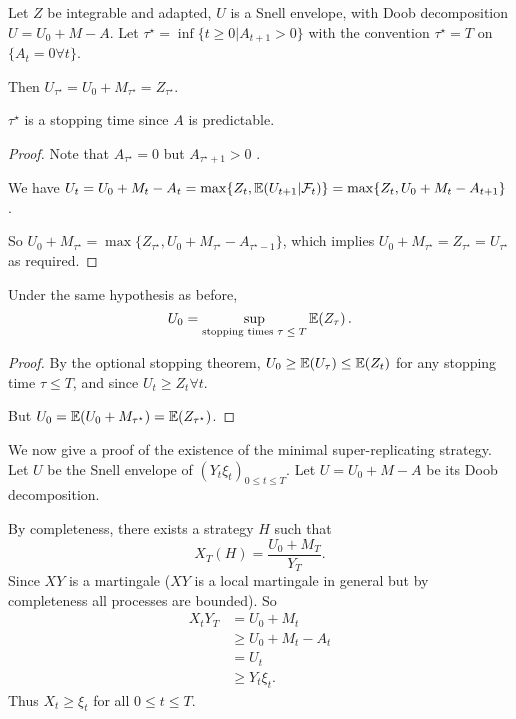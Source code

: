 \begin{thm}
  \label{defn:discrete_time_models:32}
  Let $Z$ be integrable and adapted, $U$ is a Snell envelope, with
  Doob decomposition $U = U_{0} + M - A$.  Let $\tau^{\star} = \inf \{
  t \geq 0 | A_{t + 1} > 0 \}$ with the convention $\tau^{\star} = T$
  on $\{ A_{t} = 0 \forall t \}$.

  Then $U_{\tau^{\star}} = U_{0} + M_{\tau^{\star}} = Z_{\tau^{\star}}$.
\end{thm}

\begin{remark}
  $\tau^{\star}$ is a stopping time since $A$ is predictable.
\end{remark}

\begin{proof}
  Note that $A_{\tau^{\star}} = 0$ but $A_{\tau^{\star} + 1} > 0$ .

  We have $U_{t} = U_{0} + M_{t} - A_{t} = \max \{ Z_{t}, \E{U_{t+1} |
    \mathcal{F}_{t}}  \} = \max \{ Z_{t}, U_{0} + M_{t} - A_{t+1} \}$.

  So $U_{0} + M_{\tau^{\star}} = \max \{ Z_{\tau^{\star}}, U_{0} +
  M_{\tau^{\star}} - A_{\tau^{\star} - 1} \}$, which implies $U_{0} +
  M_{\tau^{\star}}= Z_{\tau^{\star}} = U_{\tau^{\star}}$ as required.
\end{proof}

\begin{thm}
  \label{defn:discrete_time_models:33}
  Under the same hypothesis as before,
  \begin{equation}
    \label{eq:27}
    U_{0} = \sup_{\text{stopping times $\tau \leq T$}} \E{Z_{\tau}}.
  \end{equation}
\end{thm}

\begin{proof}
  By the optional stopping theorem, $U_{0} \geq \E{U_{\tau}} \leq \E{Z_{t}}$ for any
  stopping time $\tau \leq T$, and since $U_{t} \geq Z_{t} \forall t$.

  But $U_{0} = \E{U_{0} + M_{\tau^{\star}}} = \E{Z_{\tau^{\star}}}$.
\end{proof}

We now give a proof of the existence of the minimal super-replicating
strategy. Let $U$ be the Snell envelope of $(Y_{t} \xi_{t})_{0 \leq t
  \leq T}$. Let $U = U_{0} +M - A$ be its Doob decomposition.

By completeness, there exists a strategy $H$ such that
\begin{equation}
  \label{eq:28}
  X_{T}(H) = \frac{U_{0} + M_{T}}{Y_{T}}.
\end{equation}  Since $XY$ is a martingale ($XY$ is a local martingale
in general but by completeness all processes are bounded).  So
\begin{align}
  \label{eq:29}
  X_{t} Y_{T} &= U_{0} + M_{t} \\
  &\geq U_{0} + M_{t} - A_{t} \\
  &= U_{t} \\
  &\geq Y_{t} \xi_{t}.
\end{align} Thus $X_{t} \geq \xi_{t}$ for all $0 \leq t \leq T$.

